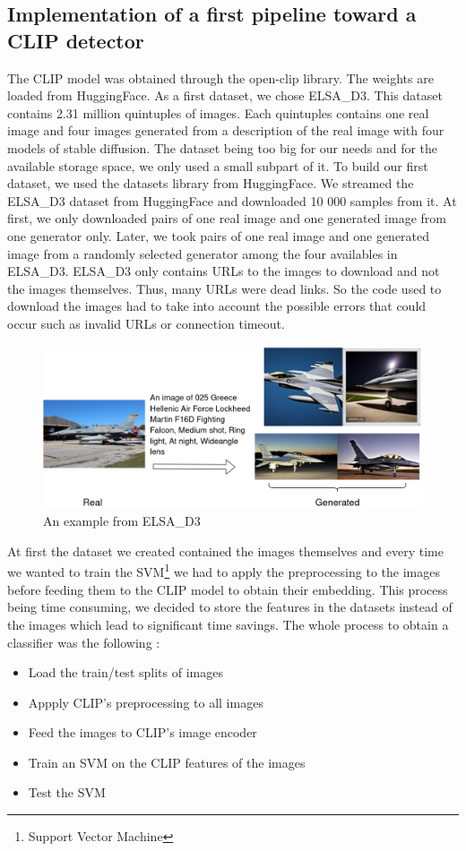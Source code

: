 \documentclass[12pt,a4paper]{article}
\begin{document}
\subsection{Implementation of a first pipeline toward a CLIP detector}
The CLIP model was obtained through the open-clip library. The weights are loaded from HuggingFace. As a first dataset, we chose ELSA\_D3. This dataset contains 2.31 million quintuples of images. Each quintuples contains one real image and four images generated from a description of the real image with four models of stable diffusion. The dataset being too big for our needs and for the available storage space, we only used a small subpart of it. To build our first dataset, we used the datasets library from HuggingFace. We streamed the ELSA\_D3 dataset from HuggingFace and downloaded 10 000 samples from it. At first, we only downloaded pairs of one real image and one generated image from one generator only. Later, we took pairs of one real image and one generated image from a randomly selected generator among the four availables in ELSA\_D3. ELSA\_D3 only contains URLs to the images to download and not the images themselves. Thus, many URLs were dead links. So the code used to download the images had to take into account the possible errors that could occur such as invalid URLs or connection timeout. 

\begin{figure}[H]
    \includegraphics*[width=\textwidth]{img/ELSA.png}
    \caption{An example from ELSA\_D3}
\end{figure}

At first the dataset we created contained the images themselves and every time we wanted to train the SVM\footnote{Support Vector Machine} we had to apply the preprocessing to the images before feeding them to the CLIP model to obtain their embedding. This process being time consuming, we decided to store the features in the datasets instead of the images which lead to significant time savings. The whole process to obtain a classifier was the following :
\begin{itemize}
    \item Load the train/test splits of images
    \item Appply CLIP's preprocessing to all images
    \item Feed the images to CLIP's image encoder
    \item Train an SVM on the CLIP features of the images
    \item Test the SVM
\end{itemize}
\end{document}
